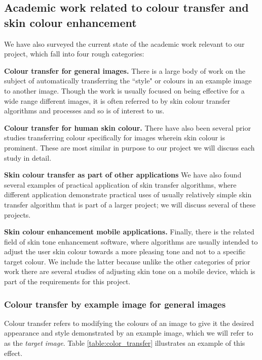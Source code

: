 

\subsection{Academic work related to colour transfer and skin colour enhancement \label{sec:academic_work}}

We have also surveyed the current state of the academic work relevant to our project, which fall into four rough categories:

\textbf{Colour transfer for general images.} There is a large body of work on the subject of automatically transferring the ``style" or colours in an example image to another image. Though the work is usually focused on being effective for a wide range different images, it is often referred to by skin colour transfer algorithms and processes and so is of interest to us.

\textbf{Colour transfer for human skin colour.} There have also been several prior studies transferring colour specifically for images wherein skin colour is prominent. These are most similar in purpose to our project we will discuss each study in detail.

\textbf{Skin colour transfer as part of other applications} We have also found several examples of practical application of skin transfer algorithms, where different application demonstrate practical uses of usually relatively simple skin transfer algorithm that is part of a larger project; we will discuss several of these projects. 

\textbf{Skin colour enhancement mobile applications.} Finally, there is the related field of skin tone enhancement software, where algorithms are usually intended to adjust the user skin colour towards a more pleasing tone and not to a specific target colour. We include the latter because unlike the other categories of prior work there are several studies of adjusting skin tone on a mobile device, which is part of the requirements for this project.

\subsubsection{Colour transfer by example image for general images}
Colour transfer refers to modifying the colours of an image to give it the desired appearance and style demonstrated by an example image, which we will refer to as the \textit{target image}. Table \ref{table:color_transfer} illustrates an example of this effect.

